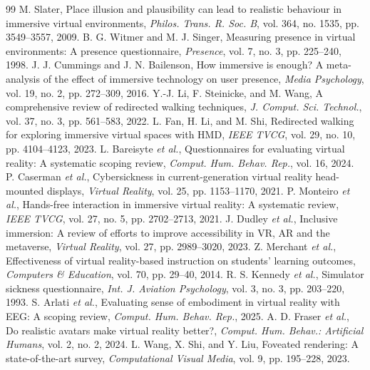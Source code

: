 \begin{thebibliography}{99}
 M. Slater, Place illusion and plausibility can lead to realistic behaviour in immersive virtual environments, \emph{Philos. Trans. R. Soc. B}, vol. 364, no. 1535, pp. 3549--3557, 2009.
 B. G. Witmer and M. J. Singer, Measuring presence in virtual environments: A presence questionnaire, \emph{Presence}, vol. 7, no. 3, pp. 225--240, 1998.
 J. J. Cummings and J. N. Bailenson, How immersive is enough? A meta-analysis of the effect of immersive technology on user presence, \emph{Media Psychology}, vol. 19, no. 2, pp. 272--309, 2016.
 Y.-J. Li, F. Steinicke, and M. Wang, A comprehensive review of redirected walking techniques, \emph{J. Comput. Sci. Technol.}, vol. 37, no. 3, pp. 561--583, 2022.
 L. Fan, H. Li, and M. Shi, Redirected walking for exploring immersive virtual spaces with HMD, \emph{IEEE TVCG}, vol. 29, no. 10, pp. 4104--4123, 2023.
 L. Bareisyte \emph{et al.}, Questionnaires for evaluating virtual reality: A systematic scoping review, \emph{Comput. Hum. Behav. Rep.}, vol. 16, 2024.
 P. Caserman \emph{et al.}, Cybersickness in current-generation virtual reality head-mounted displays, \emph{Virtual Reality}, vol. 25, pp. 1153--1170, 2021.
 P. Monteiro \emph{et al.}, Hands-free interaction in immersive virtual reality: A systematic review, \emph{IEEE TVCG}, vol. 27, no. 5, pp. 2702--2713, 2021.
 J. Dudley \emph{et al.}, Inclusive immersion: A review of efforts to improve accessibility in VR, AR and the metaverse, \emph{Virtual Reality}, vol. 27, pp. 2989--3020, 2023.
 Z. Merchant \emph{et al.}, Effectiveness of virtual reality-based instruction on students' learning outcomes, \emph{Computers \& Education}, vol. 70, pp. 29--40, 2014.
 R. S. Kennedy \emph{et al.}, Simulator sickness questionnaire, \emph{Int. J. Aviation Psychology}, vol. 3, no. 3, pp. 203--220, 1993.
 S. Arlati \emph{et al.}, Evaluating sense of embodiment in virtual reality with EEG: A scoping review, \emph{Comput. Hum. Behav. Rep.}, 2025.
 A. D. Fraser \emph{et al.}, Do realistic avatars make virtual reality better?, \emph{Comput. Hum. Behav.: Artificial Humans}, vol. 2, no. 2, 2024.
 L. Wang, X. Shi, and Y. Liu, Foveated rendering: A state-of-the-art survey, \emph{Computational Visual Media}, vol. 9, pp. 195--228, 2023.

\end{thebibliography}
